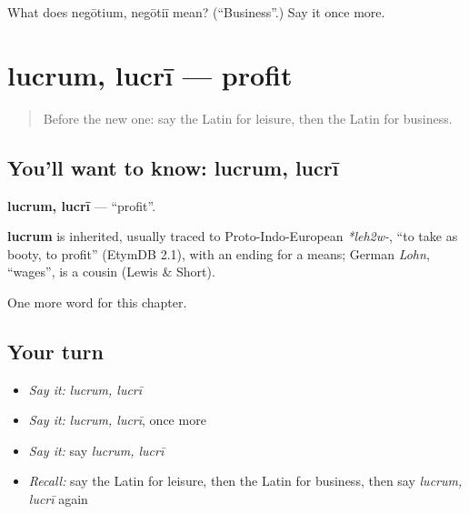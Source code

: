 \begin{tcolorbox}[breakable,colback=teal!4,colframe=teal!35!black,title={Before you move on}]
What does negōtium, negōtiī mean? (\textquotedblleft{}Business\textquotedblright{}.) Say it once more.
\end{tcolorbox}
\section[lucrum, lucrī]{lucrum, lucrī — profit}

\label{lesson:LA-C274-lucrum}



\begin{quote}
Before the new one: say the Latin for leisure, then the Latin for business.
\end{quote}

\subsection*{You'll want to know: lucrum, lucrī}
\textbf{lucrum, lucrī} — \textquotedblleft{}profit\textquotedblright{}.

\begin{cousinweb}
\textbf{lucrum} is inherited, usually traced to Proto-Indo-European \emph{*leh2w-}, \textquotedblleft{}to take as booty, to profit\textquotedblright{} (EtymDB 2.1), with an ending for a means; German \emph{Lohn}, \textquotedblleft{}wages\textquotedblright{}, is a cousin (Lewis \& Short).
\end{cousinweb}

\begin{grammarlens}[title={What you've built}]
One more word for this chapter.
\end{grammarlens}

\subsection*{Your turn}
\begin{itemize}
\raggedright
  \item \emph{Say it:} \emph{lucrum, lucrī}
  \item \emph{Say it:} \emph{lucrum, lucrī}, once more
  \item \emph{Say it:} say \emph{lucrum, lucrī}
  \item \emph{Recall:} say the Latin for leisure, then the Latin for business, then say \emph{lucrum, lucrī} again
\end{itemize}

